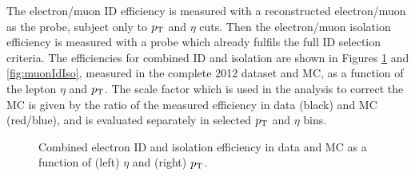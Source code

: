 The electron/muon ID efficiency is measured with a reconstructed
electron/muon as the probe, subject only to $p_{\mathrm{T}}$ and $\eta$ cuts. 
Then the electron/muon isolation efficiency is measured
with a probe which already fulfils the full ID selection criteria. 
The efficiencies for combined ID and isolation are shown in Figures
\ref{fig:electronIdIso} and \ref{fig:muonIdIso}, measured in the complete 2012
dataset and \ac{MC}, as a function of the lepton $\eta$ and $p_{\mathrm{T}}$.
The scale factor which is used in the analysis to correct the \ac{MC} is given by the ratio of the
measured efficiency in data (black) and MC (red/blue), and is evaluated separately in
selected $p_{\mathrm{T}}$ and $\eta$ bins.

\begin{figure}[htb]
\caption{Combined electron ID and isolation efficiency in data and MC as a
function of (left) $\eta$ and (right) $p_{\mathrm{T}}$.}
\label{fig:electronIdIso}
\end{figure}

